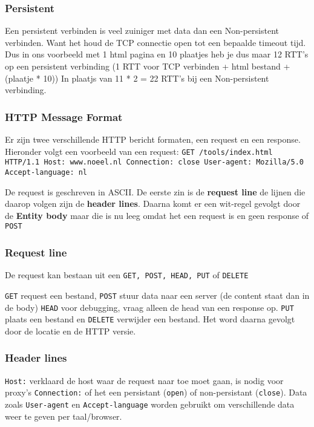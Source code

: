 \subsubsection*{Persistent}
Een persistent verbinden is veel zuiniger met data dan een Non-persistent verbinden. Want het houd de TCP connectie open tot een bepaalde timeout tijd. Dus in ons voorbeeld met 1 html pagina en 10 plaatjes heb je dus maar 12 RTT's op een persistent verbinding 
(1 RTT voor TCP verbinden + html bestand + (plaatje * 10)) In plaatjs van 11 * 2 = 22 RTT's bij een Non-persistent verbinding.

\subsubsection{HTTP Message Format}
Er zijn twee verschillende HTTP bericht formaten, een request en een response. Hieronder volgt een voorbeeld van een request:
\newline
\texttt{GET /tools/index.html HTTP/1.1\newline
		Host: 			www.noeel.nl\newline
		Connection: 	close\newline
		User-agent: 	Mozilla/5.0\newline
		Accept-language: nl\newline
	}

De request is geschreven in ASCII. De eerste zin is de \textbf{request line} de lijnen die daarop volgen zijn de \textbf{header lines}. Daarna komt er een wit-regel gevolgt door de \textbf{Entity body} maar die is nu leeg omdat het een request is en geen response of \texttt{POST}
\newline
\subsubsection*{Request line}
De request kan bestaan uit een \texttt{GET, POST, HEAD, PUT} of \texttt{DELETE}

\texttt{GET} request een bestand, \texttt{POST} stuur data naar een server (de content staat dan in de body)
\texttt{HEAD} voor debugging, vraag alleen de head van een response op. \texttt{PUT} plaats een bestand en \texttt{DELETE} verwijder een bestand.
Het word daarna gevolgt door de locatie en de HTTP versie.

\subsubsection*{Header lines}
\texttt{Host:} verklaard de host waar de request naar toe moet gaan, is nodig voor proxy's
\texttt{Connection:} of het een persistant (\texttt{open}) of non-persistant (\texttt{close}).
Data zoals \texttt{User-agent} en \texttt{Accept-language} worden gebruikt om verschillende data weer te geven per taal/browser.

